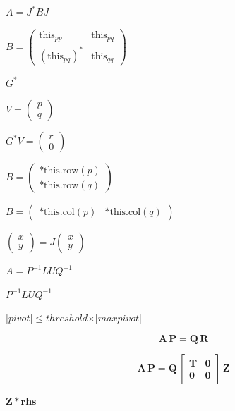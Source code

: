 \documentclass{article}
\begin{document}
$ A = J^* B J $
\pagebreak

$ B = \left ( \begin{array}{cc} \text{this}_{pp} & \text{this}_{pq} \\ (\text{this}_{pq})^* & \text{this}_{qq} \end{array} \right )$
\pagebreak

$ G^* $
\pagebreak

$ V = \left ( \begin{array}{c} p \\ q \end{array} \right )$
\pagebreak

$ G^* V = \left ( \begin{array}{c} r \\ 0 \end{array} \right )$
\pagebreak

$ B = \left ( \begin{array}{cc} \text{*this.row}(p) \\ \text{*this.row}(q) \end{array} \right ) $
\pagebreak

$ B = \left ( \begin{array}{cc} \text{*this.col}(p) & \text{*this.col}(q) \end{array} \right ) $
\pagebreak

$ \left ( \begin{array}{cc} x \\ y \end{array} \right )  =  J \left ( \begin{array}{cc} x \\ y \end{array} \right ) $
\pagebreak

$ A = P^{-1} L U Q^{-1} $
\pagebreak

$ P^{-1} L U Q^{-1} $
\pagebreak

$ \vert pivot \vert \leqslant threshold \times \vert maxpivot \vert $
\pagebreak

\[ \mathbf{A} \, \mathbf{P} = \mathbf{Q} \, \mathbf{R}
\]
\pagebreak

\[ \mathbf{A} \, \mathbf{P} = \mathbf{Q} \,
                    \begin{bmatrix} \mathbf{T} &  \mathbf{0} \\
                                    \mathbf{0} & \mathbf{0} \end{bmatrix} \, \mathbf{Z}
\]
\pagebreak

$ \mathbf{Z} * \mathbf{rhs} $
\pagebreak
\end{document}
